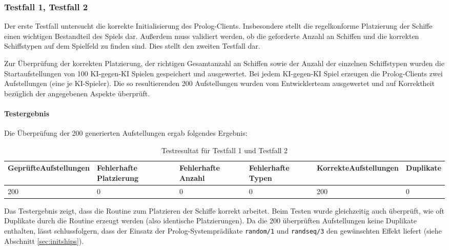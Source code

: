 	\subsubsection{Testfall 1, Testfall 2} %
	\label{ssub:testfall_1_testfall_2}
		Der erste Testfall untersucht die korrekte Initialisierung des Prolog-Clients. Insbesondere stellt die regelkonforme Platzierung der
		Schiffe einen wichtigen Bestandteil des Spiels dar. 
		Außerdem muss validiert werden, ob die geforderte Anzahl an Schiffen und die
		korrekten Schiffstypen auf dem Spielfeld zu finden sind. Dies stellt den zweiten Testfall dar.
	
		Zur Überprüfung der korrekten Platzierung, der richtigen Gesamtanzahl an Schiffen sowie der Anzahl der einzelnen Schiffstypen wurden 
		die Startaufstellungen von 100 KI-gegen-KI Spielen gespeichert und ausgewertet. Bei jedem KI-gegen-KI Spiel erzeugen die Prolog-Clients zwei 
		Aufstellungen (eine je KI-Spieler). Die so resultierenden 200 Aufstellungen wurden vom Entwicklerteam ausgewertet und auf Korrektheit bezüglich der 
		angegebenen Aspekte überprüft.
		
		\paragraph{Testergebnis} %
		\label{par:testergebnis}
			Die Überprüfung der 200 generierten Aufstellungen ergab folgendes Ergebnis:
			\begin{table}[H] %
				\centering
				\begin{tabular}{|p{}|p{}|p{}|p{.15\textwidth}|p{}|p{}|} 
					\hline
					Geprüfte\newline Aufstellungen & Fehlerhafte Platzierung&Fehlerhafte Anzahl&Fehlerhafte Typen&Korrekte\newline Aufstellungen&Duplikate\\ 
					\hline\hline
					200 & 0 & 0 & 0 & 200 & 0\\
					\hline
				\end{tabular}
				\caption{Testresultat für Testfall 1 und Testfall 2}
				\label{tbl:tf1tf2}
			\end{table}
		Das Testergebnis zeigt, dass die Routine zum Platzieren der Schiffe korrekt arbeitet. Beim Testen wurde gleichzeitig auch überprüft, 
		wie oft Duplikate durch die Routine erzeugt werden (also identische Platzierungen).
		Da die 200 überprüften Aufstellungen keine Duplikate enthalten, lässt schlussfolgern, dass der Einsatz der Prolog-Systemprädikate \texttt{random/1} und \texttt{randseq/3} 
		den gewünschten Effekt liefert (siehe Abschnitt \ref{sec:initships}).
		
